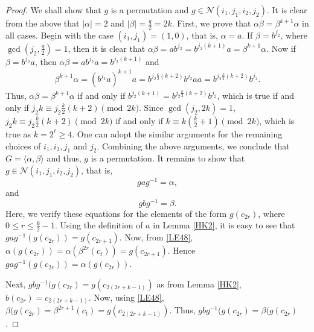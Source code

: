 \documentclass[11pt]{amsart}
\theoremstyle{plain}
\numberwithin{equation}{section}
\begin{document}
\begin{proof}
We shall show that $g$ is a permutation and $g \in \mathcal{N}(i_1,j_1,i_2,j_2)$. It is clear from the above that $|\alpha|=2$ and $|\beta|=\frac{q}{2}=2k$. First, we prove that $\alpha \beta=\beta^{k+1}\alpha$ in all cases. Begin with the case $(i_1,j_1)=(1,0)$, that is, $\alpha=a$. If $\beta=b^{j_2}$, where $\gcd(j_2,\frac{q}{2})=1$, then it is clear that $\alpha \beta =ab^{j_2}=b^{j_2(k+1)}a=\beta^{k+1}\alpha$. Now if $\beta=b^{j_2}a$, then $\alpha \beta=a b^{j_2}a=b^{j_2(k+1)}$ and 
\begin{equation*}
\begin{split}
\beta^{k+1}\alpha=(b^{j_2}a)^{k+1}a=b^{j_2\frac{k}{2}(k+2)}b^{j_2}aa=b^{j_2\frac{k}{2}(k+2)}b^{j_2}.
\end{split}
\end{equation*}
Thus, $\alpha \beta=\beta^{k+1}\alpha$ if and only if $b^{j_2(k+1)}=b^{j_2\frac{k}{2}(k+2)}b^{j_2}$, which is true if and only if $j_2k \equiv j_2\frac{k}{2}(k+2) \pmod {2k}$. Since $\gcd(j_2,2k)=1$, $j_2k \equiv j_2\frac{k}{2}(k+2) \pmod {2k}$ if and only if $k \equiv k(\frac{k}{2}+1) \pmod {2k}$, which is true as $k=2^{\ell}\geq 4$. One can adopt the similar arguments for the remaining choices of $i_1,i_2,j_1$ and $j_2$. Combining the above arguments, we conclude that $G=\langle \alpha, \beta \rangle$ and thus, $g$ is a permutation. It remains to show that $g \in \mathcal{N}(i_1,j_1,i_2,j_2)$, that is, 
\begin{equation}\label{e46}
gag^{-1}=\alpha,
\end{equation}
 and 
\begin{equation}\label{e47}
gbg^{-1}=\beta.
\end{equation}
Here, we verify these equations for the elements of the form $g(c_{2r})$, where $0 \leq r \leq \frac{k}{2}-1$. Using the definition of $a$ in Lemma \ref{HK2}, it is easy to see that $gag^{-1}(g(c_{2r}))=g(c_{2r+1})$. Now, from \eqref{LE48}, $\alpha(g(c_{2r}))=\alpha(\beta^{2r}(c_t))=g(c_{2r+1})$. Hence $gag^{-1}(g(c_{2r}))=\alpha(g(c_{2r})).$


Next, $gbg^{-1}(g(c_{2r})=g(c_{2(2r+k-1)})$ as from Lemma \ref{HK2}, $b(c_{2r})=c_{2(2r+k-1)}$. Now, using \eqref{LE48}, $\beta(g(c_{2r})=\beta^{2r+1}(c_t)=g(c_{2(2r+k-1)}).$ Thus, $gbg^{-1}(g(c_{2r})=\beta(g(c_{2r})$.




\end{proof}
\end{document}

